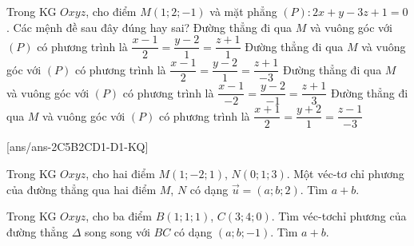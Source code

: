 \begin{ex}%
Trong KG $Oxyz$, cho điểm $M(1;2;-1)$ và mặt phẳng $(P)\colon 2x+y-3z+1=0$. Các mệnh đề sau đây đúng hay sai?
\choiceTF
{ Đường thẳng đi qua $M$ và vuông góc với $(P)$ có phương trình là $\dfrac{x-1}{2}=\dfrac{y-2}{1}=\dfrac{z+1}{1}$}
{\True  Đường thẳng đi qua $M$ và vuông góc với $(P)$ có phương trình là $\dfrac{x-1}{2}=\dfrac{y-2}{1}=\dfrac{z+1}{-3}$}
{\True  Đường thẳng đi qua $M$ và vuông góc với ${(P)}$ có phương trình là $\dfrac{x-1}{-2}=\dfrac{y-2}{-1}=\dfrac{z+1}{3}$}
{Đường thẳng đi qua $M$ và vuông góc với $(P)$ có phương trình là $\dfrac{x+1}{2}=\dfrac{y+2}{1}=\dfrac{z-1}{-3}$}
\end{ex}


[ans/ans-2C5B2CD1-D1-KQ]
\TNSA
\begin{ex}%
Trong KG $Oxyz$, cho hai điểm $M\left( 1;-2;1 \right)$, $N\left( 0;1;3 \right)$. Một véc-tơ chỉ phương của đường thẳng qua hai điểm $M$, $N$ có dạng $\overrightarrow{u}=(a;b;2)$. Tìm $a+b.$
\end{ex}
\begin{ex}%
	Trong KG $Oxyz$, cho ba điểm $B\left( 1;1;1 \right)$, $C\left( 3;4;0 \right)$. Tìm véc-tơchỉ phương của đường thẳng $\Delta $ song song với $BC$ có dạng $(a;b;-1)$. Tìm $a+b$.
\end{ex}

